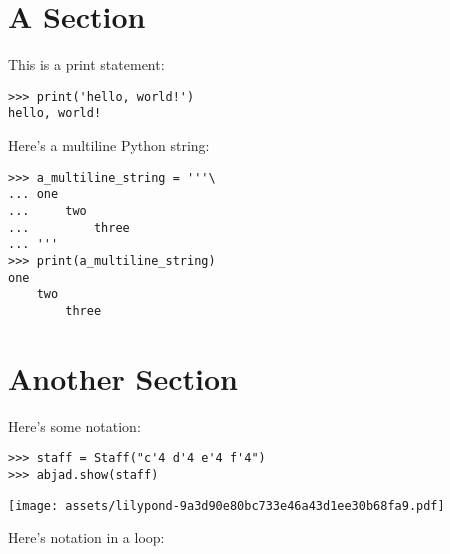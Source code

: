 \documentclass{article}
\begin{document}
\section{A Section}

This is a print statement:

\begin{comment}
<abjad>
print('hello, world!')
</abjad>
\end{comment}

\begin{lstlisting}
>>> print('hello, world!')
hello, world!
\end{lstlisting}

Here's a multiline Python string:

\begin{comment}
<abjad>
a_multiline_string = '''\
one
    two
        three
'''
print(a_multiline_string)
</abjad>
\end{comment}

\begin{lstlisting}
>>> a_multiline_string = '''\
... one
...     two
...         three
... '''
>>> print(a_multiline_string)
one
    two
        three
\end{lstlisting}

\section{Another Section}

Here's some notation:

\begin{comment}
<abjad>
staff = Staff("c'4 d'4 e'4 f'4")
abjad.show(staff)
</abjad>
\end{comment}

\begin{lstlisting}
>>> staff = Staff("c'4 d'4 e'4 f'4")
>>> abjad.show(staff)
\end{lstlisting}
\noindent\texttt{[image: assets/lilypond-9a3d90e80bc733e46a43d1ee30b68fa9.pdf]}

Here's notation in a loop:

\begin{comment}
<abjad>
for leaf in iterate(staff).leaves():
    duration = inspect(leaf).get_duration()
    print(duration)
    abjad.show(leaf)

</abjad>
\end{comment}
\end{document}
